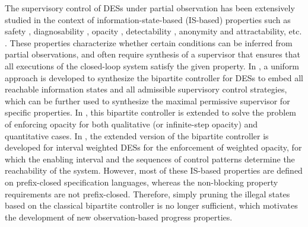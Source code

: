 \documentclass[journal,twoside,web]{ieeecolor}
\begin{document}
The supervisory control of DESs under partial observation has been extensively studied in the context of information-state-based (IS-based) properties such as safety \cite{ma2022resilient}, diagnosability \cite{li2025supervisory, hu2023asynchronous}, opacity \cite{lafortune2018history, zheng2026enforcement},
detectability \cite{shu2013enforcing}, anonymity and attractability, etc. \cite{yin2024formal, basile2022supervisory}.
These properties characterize whether certain conditions can be inferred from partial observations, and often require synthesis of a supervisor that ensures that all executions of the closed-loop system satisfy the given property.
%
In \cite{yin2016uniform}, a uniform approach is developed to synthesize the bipartite controller for DESs to embed all reachable information states and all admissible supervisory control strategies, which can be further used to synthesize the maximal permissive supervisor for specific properties.
In \cite{xie2023optimal}, this bipartite controller is extended to solve the problem of enforcing opacity for both qualitative (or infinite-step opacity) and quantitative cases.
In \cite{zheng2026enforcement}, the extended version of the bipartite controller is developed for interval weighted DESs for the enforcement of weighted opacity, for which the enabling interval and the sequences of control patterns determine the reachability of the system.
%
However, most of these IS-based properties are defined on prefix-closed specification languages, whereas the non-blocking property requirements are not prefix-closed.
Therefore, simply pruning the illegal states based on the classical bipartite controller is no longer sufficient, which motivates the development of new observation-based progress properties.
\end{document}
